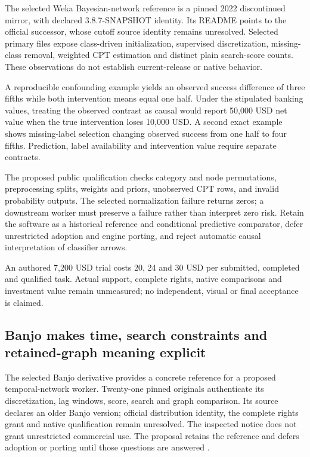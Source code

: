 The selected Weka Bayesian-network reference is a pinned 2022
discontinued mirror, with declared 3.8.7-SNAPSHOT identity. Its README
points to the official successor, whose cutoff source identity remains
unresolved. Selected primary files expose class-driven initialization,
supervised discretization, missing-class removal, weighted CPT
estimation and distinct plain search-score counts. These observations do
not establish current-release or native
behavior.\citep{exec24_weka_source}

A reproducible confounding example yields an observed success difference
of three fifths while both intervention means equal one half. Under the
stipulated banking values, treating the observed contrast as causal
would report 50,000 USD net value when the true intervention loses
10,000 USD. A second exact example shows missing-label selection
changing observed success from one half to four fifths. Prediction,
label availability and intervention value require separate
contracts.\citep{exec24_weka_choice}

The proposed public qualification checks category and node permutations,
preprocessing splits, weights and priors, unobserved CPT rows, and
invalid probability outputs. The selected normalization failure returns
zeros; a downstream worker must preserve a failure rather than interpret
zero risk. Retain the software as a historical reference and conditional
predictive comparator, defer unrestricted adoption and engine porting,
and reject automatic causal interpretation of classifier
arrows.\citep{exec24_weka_source,exec24_weka_choice}

An authored 7,200 USD trial costs 20, 24 and 30 USD per submitted,
completed and qualified task. Actual support, complete rights, native
comparisons and investment value remain unmeasured; no independent,
visual or final acceptance is claimed.\citep{exec24_weka_choice}

\hypertarget{banjo-makes-time-search-constraints-and-retained-graph-meaning-explicit}{%
\subsection{Banjo makes time, search constraints and retained-graph
meaning
explicit}\label{banjo-makes-time-search-constraints-and-retained-graph-meaning-explicit}}

The selected Banjo derivative provides a concrete reference for a
proposed temporal-network worker. Twenty-one pinned originals
authenticate its discretization, lag windows, score, search and graph
comparison. Its source declares an older Banjo version; official
distribution identity, the complete rights grant and native
qualification remain unresolved. The inspected notice does not grant
unrestricted commercial use. The proposal retains the reference and
defers adoption or porting until those questions are answered
\citep{exec24_banjo_source,exec24_banjo_choice}.

